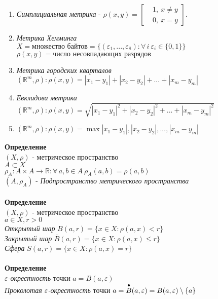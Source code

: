 \documentclass[12pt]{article}
\begin{document}
\begin{enumerate}
    \item \textit{Симплициальная метрика} - $\rho(x,y) = \begin{bmatrix}
         & 1,\ x\neq y \\
         & 0,\ x = y
    \end{bmatrix}.$
    \item \textit{Метрика Хемминга}\\
    $X = \text{множество байтов} = \{(\varepsilon_1, ..., \varepsilon_8):\forall\,i\ \varepsilon_i\in \{0,1\}\}$\\
    $\rho(x,y) = \text{число несовпадающих разрядов}$
    \item \textit{Метрика городских кварталов}\\
    $(\mathbb{R}^m, \rho): \rho(x,y) = |x_1-y_1|+|x_2-y_2|+...+|x_m-y_m|$
    \item \textit{Евклидова метрика}\\
    $(\mathbb{R}^m, \rho): \rho(x,y) = \sqrt{|x_1-y_1|^2+|x_2-y_2|^2+...+|x_m-y_m|^2}$
    \item $(\mathbb{R}^m, \rho): \rho(x,y) = \max{ |x_1-y_1|,|x_2-y_2|,...,|x_m-y_m|}$
\end{enumerate}
\textbf{Определение}\\
$(X,\rho)$ - метрическое пространство\\
$A \subset X$\\
$\rho_A: A \times A \rightarrow \mathbb{R} : \forall\,a,b\in A\  \rho_A(a,b)=\rho(a,b)$\\
$(A,\rho_A)$ - \textit{Подпространство метрического пространства}\\\\
\textbf{Определение}\\
$(X,\rho)$ - метрическое пространство\\
$a \in X, r > 0$\\
\textit{Открытый шар} $B(a,r) = \{x \in X: \rho(a,x) < r\}$\\
\textit{Закрытый шар} $\overline{B}(a,r) = \{x \in X: \rho(a,x) \leq r\}$\\
\textit{Сфера} $S(a,r) = \{x \in X: \rho(a,x) = r\}$\\\\
\textbf{Определение}\\
\textit{$\varepsilon$-окрестность} точки $a =B(a,\varepsilon)$\\
\textit{Проколотая $\varepsilon$-окрестность} точки $a = \overset{\bullet}{B}(a,\varepsilon) = B(a,\varepsilon)\setminus \{a\}$\\\\
\end{document}
